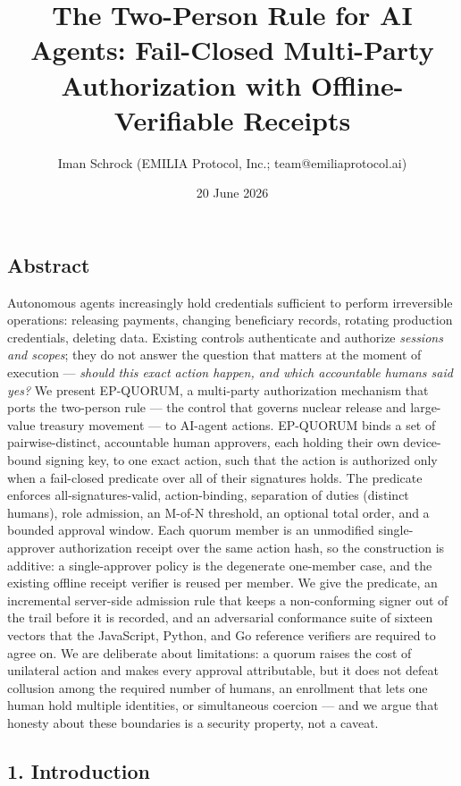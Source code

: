 \documentclass[
  11pt,
]{article}
\title{The Two-Person Rule for AI Agents: Fail-Closed Multi-Party
Authorization with Offline-Verifiable Receipts}
\author{Iman Schrock (EMILIA Protocol, Inc.; team@emiliaprotocol.ai)}
\date{20 June 2026}
\begin{document}
\maketitle

\subsection{Abstract}\label{abstract}

Autonomous agents increasingly hold credentials sufficient to perform
irreversible operations: releasing payments, changing beneficiary
records, rotating production credentials, deleting data. Existing
controls authenticate and authorize \emph{sessions and scopes}; they do
not answer the question that matters at the moment of execution ---
\emph{should this exact action happen, and which accountable humans said
yes?} We present EP-QUORUM, a multi-party authorization mechanism that
ports the two-person rule --- the control that governs nuclear release
and large-value treasury movement --- to AI-agent actions. EP-QUORUM
binds a set of pairwise-distinct, accountable human approvers, each
holding their own device-bound signing key, to one exact action, such
that the action is authorized only when a fail-closed predicate over all
of their signatures holds. The predicate enforces all-signatures-valid,
action-binding, separation of duties (distinct humans), role admission,
an M-of-N threshold, an optional total order, and a bounded approval
window. Each quorum member is an unmodified single-approver
authorization receipt over the same action hash, so the construction is
additive: a single-approver policy is the degenerate one-member case,
and the existing offline receipt verifier is reused per member. We give
the predicate, an incremental server-side admission rule that keeps a
non-conforming signer out of the trail before it is recorded, and an
adversarial conformance suite of sixteen vectors that the JavaScript,
Python, and Go reference verifiers are required to agree on. We
are deliberate about limitations: a quorum raises the cost of unilateral
action and makes every approval attributable, but it does not defeat
collusion among the required number of humans, an enrollment that lets
one human hold multiple identities, or simultaneous coercion --- and we
argue that honesty about these boundaries is a security property, not a
caveat.

\subsection{1. Introduction}\label{introduction}
\end{document}
